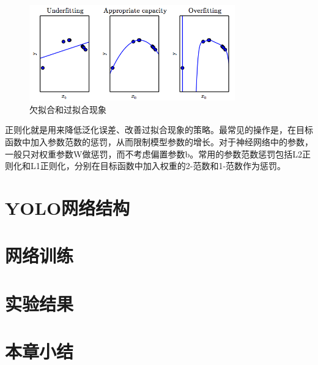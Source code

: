 \begin{figure}[htb] %
	\centering
	\includegraphics[width=3.5in]{figures/3_1_欠拟合和过拟合}
	\caption{欠拟合和过拟合现象} \label{fig:3_1_欠拟合和过拟合}
\end{figure}

正则化就是用来降低泛化误差、改善过拟合现象的策略。最常见的操作是，在目标函数中加入参数范数的惩罚，从而限制模型参数的增长。对于神经网络中的参数，一般只对权重参数W做惩罚，而不考虑偏置参数b。常用的参数范数惩罚包括L2正则化和L1正则化，分别在目标函数中加入权重的2-范数和1-范数作为惩罚。


\section{YOLO网络结构}

\section{网络训练}

\section{实验结果}

\section{本章小结}






